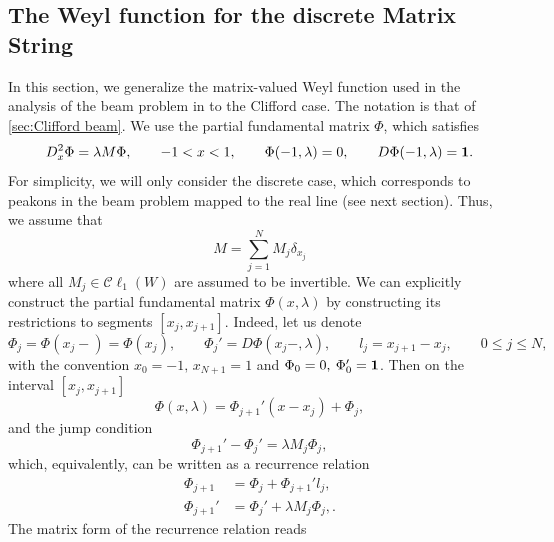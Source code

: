 \documentclass[10pt,a4paper]{article}
\numberwithin{equation}{section}
\theoremstyle{plain}
\theoremstyle{definition}
\newcommand\Cl{\mathcal{C}\ell}
\newcommand{\bo}{{\bf 1}}
\renewcommand{\l}{\lambda}
\begin{document}
\subsection{The Weyl function for the discrete Matrix String} 
In this section, we generalize the matrix-valued Weyl function used in the analysis of the beam problem in \cite{beals-szmigielski:2021p:2CH-euler-bernoulli-beam-noncommutative-continued-fractions} to the Clifford case.  The notation is that of \autoref{sec:Clifford beam}.  
We use the partial fundamental matrix $\Phi$, which satisfies 
\begin{equation} \label{eq:DIVP}
D_x^2 \Phi=\l M \Phi, \qquad -1<x<1, \qquad  \Phi(-1,\l)=0, \qquad D\Phi(-1, \l)=\bo. 
\end{equation} 
For simplicity, we will only consider the discrete case, which corresponds to peakons in the beam problem mapped to the real line (see next section). 
Thus, we assume 
that 
\begin{equation} 
M=\sum_{j=1}^N M_j \delta _{x_j}
\end{equation} where all $M_j\in \Cl_1(W)$ are assumed to be invertible.  We can explicitly construct the partial fundamental matrix $\Phi(x, \l)$ by constructing its restrictions to segments $[x_j, x_{j+1}]$.  Indeed, 
let us denote 
\begin{equation} 
\Phi_j=\Phi(x_j-)=\Phi(x_j), \qquad \Phi_j'=D\Phi(x_j-, \l),  \qquad l_j=x_{j+1}-x_j, \qquad 0\leq j\leq N, 
\end{equation} 
with the convention $x_0=-1, \, x_{N+1}=1$ and $\Phi_0=0, \: \Phi'_0=\bo$.  
Then on the interval $[x_j, x_{j+1}]$
\begin{equation} 
\Phi(x,\l)=\Phi_{j+1}'(x-x_j)+\Phi_j, 
\end{equation} 
and the jump condition
\begin{equation} 
\Phi_{j+1}'-\Phi_j'=\l M_j \Phi_j, 
\end{equation} 
which, equivalently, can be written as a recurrence relation
\begin{align} 
\Phi_{j+1}&=\Phi_j+\Phi_{j+1}'l_j, \label{eq:j+1}\\
\Phi_{j+1}'&=\Phi_j'+\l M_j \Phi_j,  \label{eq:prime j+1}.  
\end{align} 
The matrix form of the recurrence relation reads
\end{document}
